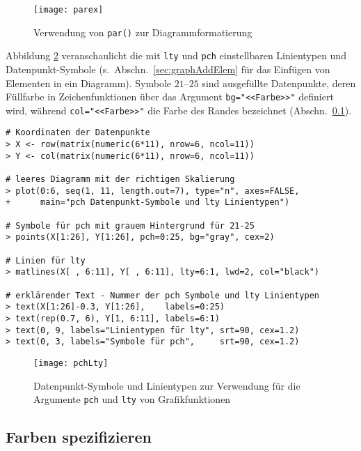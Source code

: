 \begin{figure}[ht]
\centering
\texttt{[image: parex]}
\vspace*{-1em}
\caption{Verwendung von \lstinline!par()! zur Diagrammformatierung}
\label{fig:par}
\end{figure}

Abbildung \ref{fig:pchLty} veranschaulicht die mit \lstinline!lty! und \lstinline!pch! einstellbaren Linientypen und Datenpunkt-Symbole (s.\ Abschn.\ \ref{sec:graphAddElem} für das Einfügen von Elementen in ein Diagramm). Symbole $21$--$25$ sind ausgefüllte Datenpunkte, deren Füllfarbe in Zeichenfunktionen über das Argument \lstinline!bg="<<Farbe>>"! definiert wird, während \lstinline!col="<<Farbe>>"! die Farbe des Randes bezeichnet (Abschn.\ \ref{sec:colors}).
\begin{lstlisting}
# Koordinaten der Datenpunkte
> X <- row(matrix(numeric(6*11), nrow=6, ncol=11))
> Y <- col(matrix(numeric(6*11), nrow=6, ncol=11))

# leeres Diagramm mit der richtigen Skalierung
> plot(0:6, seq(1, 11, length.out=7), type="n", axes=FALSE,
+      main="pch Datenpunkt-Symbole und lty Linientypen")

# Symbole für pch mit grauem Hintergrund für 21-25
> points(X[1:26], Y[1:26], pch=0:25, bg="gray", cex=2)

# Linien für lty
> matlines(X[ , 6:11], Y[ , 6:11], lty=6:1, lwd=2, col="black")

# erklärender Text - Nummer der pch Symbole und lty Linientypen
> text(X[1:26]-0.3, Y[1:26],    labels=0:25)
> text(rep(0.7, 6), Y[1, 6:11], labels=6:1)
> text(0, 9, labels="Linientypen für lty", srt=90, cex=1.2)
> text(0, 3, labels="Symbole für pch",     srt=90, cex=1.2)
\end{lstlisting}

\begin{figure}[ht]
\centering
\texttt{[image: pchLty]}
\vspace*{-1em}
\caption{Datenpunkt-Symbole und Linientypen zur Verwendung für die Argumente \lstinline!pch! und \lstinline!lty! von Grafikfunktionen}
\label{fig:pchLty}
\end{figure}

\subsection{Farben spezifizieren}
\label{sec:colors}

